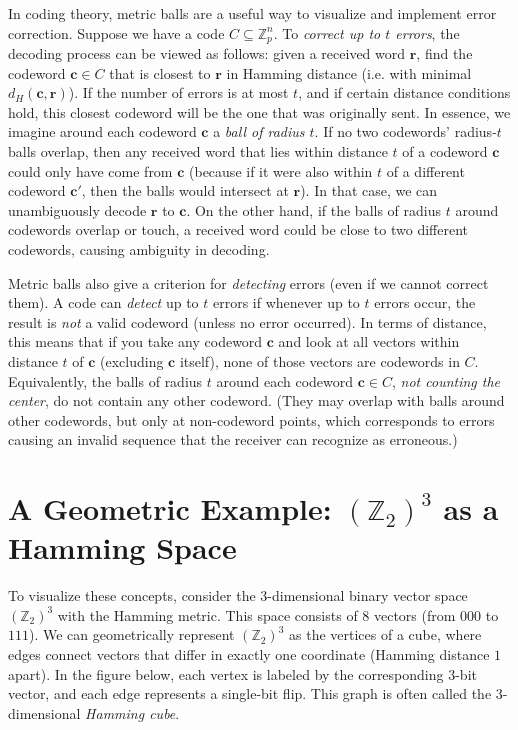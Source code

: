 \documentclass[docmute]{article}
\begin{document}
In coding theory, metric balls are a useful way to visualize and implement error correction. Suppose we have a code $C \subseteq \mathbb{Z}_p^n$. To \emph{correct up to $t$ errors}, the decoding process can be viewed as follows: given a received word $\mathbf{r}$, find the codeword $\mathbf{c} \in C$ that is closest to $\mathbf{r}$ in Hamming distance (i.e. with minimal $d_H(\mathbf{c},\mathbf{r})$). If the number of errors is at most $t$, and if certain distance conditions hold, this closest codeword will be the one that was originally sent. In essence, we imagine around each codeword $\mathbf{c}$ a \emph{ball of radius $t$}. If no two codewords’ radius-$t$ balls overlap, then any received word that lies within distance $t$ of a codeword $\mathbf{c}$ could only have come from $\mathbf{c}$ (because if it were also within $t$ of a different codeword $\mathbf{c'}$, then the balls would intersect at $\mathbf{r}$). In that case, we can unambiguously decode $\mathbf{r}$ to $\mathbf{c}$. On the other hand, if the balls of radius $t$ around codewords overlap or touch, a received word could be close to two different codewords, causing ambiguity in decoding.

Metric balls also give a criterion for \emph{detecting} errors (even if we cannot correct them). A code can \emph{detect} up to $t$ errors if whenever up to $t$ errors occur, the result is \emph{not} a valid codeword (unless no error occurred). In terms of distance, this means that if you take any codeword $\mathbf{c}$ and look at all vectors within distance $t$ of $\mathbf{c}$ (excluding $\mathbf{c}$ itself), none of those vectors are codewords in $C$. Equivalently, the balls of radius $t$ around each codeword $\mathbf{c} \in C$, \emph{not counting the center}, do not contain any other codeword. (They may overlap with balls around other codewords, but only at non-codeword points, which corresponds to errors causing an invalid sequence that the receiver can recognize as erroneous.)

\section{A Geometric Example: $(\mathbb{Z}_2)^3$ as a Hamming Space}

To visualize these concepts, consider the 3-dimensional binary vector space $(\mathbb{Z}_2)^3$ with the Hamming metric. This space consists of 8 vectors (from $000$ to $111$). We can geometrically represent $(\mathbb{Z}_2)^3$ as the vertices of a cube, where edges connect vectors that differ in exactly one coordinate (Hamming distance $1$ apart). In the figure below, each vertex is labeled by the corresponding 3-bit vector, and each edge represents a single-bit flip. This graph is often called the 3-dimensional \emph{Hamming cube}.
\end{document}
